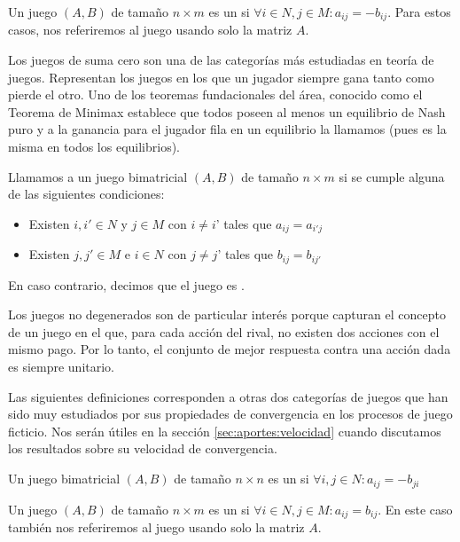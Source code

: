 \begin{definition}
    Un juego $(A, B)$ de tamaño $n \times m$ es un  si $\forall i \in N, j \in M : a_{ij} = -b_{ij}$. Para estos casos, nos referiremos al juego usando solo la matriz $A$.
\end{definition}

Los juegos de suma cero son una de las categorías más estudiadas en teoría de juegos. Representan los juegos en los que un jugador siempre gana tanto como pierde el otro. Uno de los teoremas fundacionales del área, conocido como el Teorema de Minimax \cite{nash:minimax} establece que todos poseen al menos un equilibrio de Nash puro y a la ganancia para el jugador fila en un equilibrio la llamamos  (pues es la misma en todos los equilibrios).

\begin{definition}
    Llamamos  a un juego bimatricial $(A, B)$ de tamaño $n \times m$ si se cumple alguna de las siguientes condiciones:
    \begin{itemize}
        \item Existen $i, i' \in N$ y $j \in M$ con $i \neq i$' tales que $a_{ij} = a_{i'j}$
        \item Existen $j, j' \in M$ e $i \in N$ con $j \neq j$' tales que $b_{ij} = b_{ij'}$
    \end{itemize}
    En caso contrario, decimos que el juego es .
\end{definition}
Los juegos no degenerados son de particular interés porque capturan el concepto de un juego en el que, para cada acción del rival, no existen dos acciones con el mismo pago. Por lo tanto, el conjunto de mejor respuesta contra una acción dada es siempre unitario.

Las siguientes definiciones corresponden a otras dos categorías de juegos que han sido muy estudiados por sus propiedades de convergencia en los procesos de juego ficticio. Nos serán útiles en la sección \ref{sec:aportes:velocidad} cuando discutamos los resultados sobre su velocidad de convergencia.

\begin{definition}
    Un juego bimatricial $(A, B)$ de tamaño $n \times n$ es un  si $\forall i, j \in N : a_{ij} = -b_{ji}$
\end{definition}

\begin{definition}
    Un juego $(A, B)$ de tamaño $n \times m$ es un  si $\forall i \in N, j \in M : a_{ij} = b_{ij}$. En este caso también nos referiremos al juego usando solo la matriz $A$.
\end{definition}

